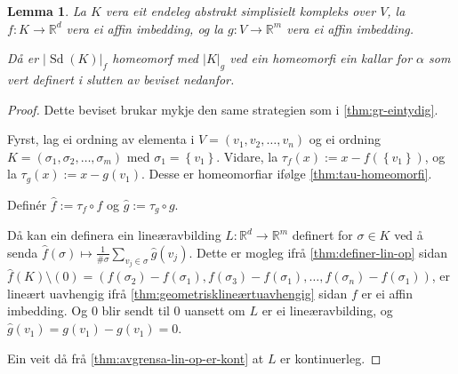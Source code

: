 \documentclass[a4paper, 12pt, norsk]{article}
\theoremstyle{plain}
\newtheorem{lemma}[theorem]{Lemma}
\theoremstyle{definition}
\newcommand{\Rb}{\mathbb{R}}
\newcommand{\gr}[1]{ \lvert #1 \rvert } %
\newcommand{\set}[1]{ \left\{ #1 \right\} } %
\newcommand{\tuple}[1]{ \left( #1 \right) } %
\DeclareMathOperator{\Sd}{Sd} %
\begin{document}
\begin{lemma} \label{thm:alpha-homeomorfi}
	La \( K \) vera eit endeleg abstrakt simplisielt kompleks over \( V \), la \( f: K \to \Rb^d \) vera ei affin imbedding, og la \( g: V \to \Rb^m \) vera ei affin imbedding.
	
	Då er \( \gr{\Sd(K)}_f  \) homeomorf med \( \gr{K}_g \) ved ein homeomorfi ein kallar for \( \alpha \) som vert definert i slutten av beviset nedanfor.
\end{lemma}

\begin{proof}
	Dette beviset brukar mykje den same strategien som i \autoref{thm:gr-eintydig}.

	Fyrst, lag ei ordning av elementa i \( V = (v_1, v_2, \dots, v_n) \) og ei ordning \( K = (\sigma_1, \sigma_2, \dots, \sigma_m) \) med \( \sigma_1 = \set{v_1} \). Vidare, la \( \tau_f(x) := x-f(\set{v_1}) \), og la \( \tau_g(x) := x-g(v_1) \). Desse er homeomorfiar ifølge \autoref{thm:tau-homeomorfi}.

	Definér \( \hat{f} := \tau_f \circ f \) og \( \hat{g} := \tau_g \circ g \).

	Då kan ein definera ein lineæravbilding \( L: \Rb^d \to \Rb^m \) definert for \( \sigma \in K \) ved å senda \( \hat{f}(\sigma) \mapsto \frac{1}{\#\sigma}\sum_{v_j \in \sigma} \hat{g}(v_j) \). Dette er mogleg ifrå \autoref{thm:definer-lin-op} sidan \( \hat{f}(K) \setminus \tuple{0} = (f(\sigma_2)-f(\sigma_1), f(\sigma_3)-f(\sigma_1), \dots, f(\sigma_n)-f(\sigma_1) ) \), er lineært uavhengig ifrå \autoref{thm:geometrisklineærtuavhengig} sidan \( f \) er ei affin imbedding. Og \( 0 \) blir sendt til \( 0 \) uansett om \( L \) er ei lineæravbilding, og \( \hat{g}(v_1) = g(v_1)-g(v_1) = 0 \).

	Ein veit då frå \autoref{thm:avgrensa-lin-op-er-kont} at \( L \) er kontinuerleg. 


\end{proof}
\end{document}
